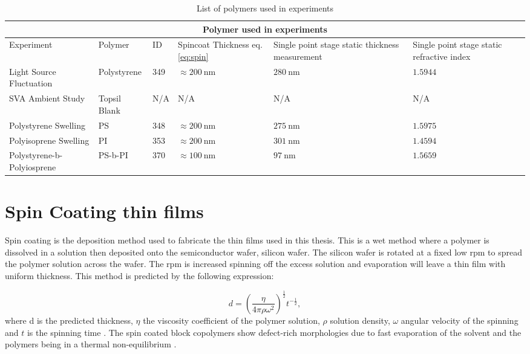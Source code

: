 \documentclass[MasterThesisMain.tex]{subfiles}
\begin{document}
\begin{table}
	\caption{List of polymers used in experiments}
\begin{tabular}{ |p{3cm}||p{2cm}|p{2cm}|p{2cm}|p{2cm}|p{2cm}|  }
 \hline
 \multicolumn{6}{|c|}{Polymer used in experiments} \\
 \hline
 Experiment & Polymer & ID & Spincoat Thickness eq.\ref{eq:spin} & Single point stage static thickness measurement & Single point stage static refractive index\\
 \hline
 Light Source Fluctuation & Polystyrene & 349 & $\approx\SI{200}{\nano\meter}$ & $\SI{280}{\nano\meter}$ & $1.5944$  \\
 SVA Ambient Study & Topsil Blank & N/A & N/A & N/A & N/A  \\
 Polystyrene Swelling & PS  & 348  & $\approx\SI{200}{\nano\meter}$ & $\SI{275}{\nano\meter}$ & $1.5975$  \\
 Polyisoprene Swelling & PI  & 353 & $\approx\SI{200}{\nano\meter}$ & $\SI{301}{\nano\meter}$ & $1.4594$  \\
 Polystyrene-b-Polyiosprene & PS-b-PI & 370 & $\approx\SI{100}{\nano\meter}$ & $\SI{97}{\nano\meter}$ & $1.5659$ \\  
\hline
\end{tabular}
\label{tab:polymers}
\end{table}

\section{Spin Coating thin films}
Spin coating is the deposition method used to fabricate the thin films used in this thesis. This is a wet method where a polymer is dissolved in a solution then deposited onto the semiconductor wafer, silicon wafer. The silicon wafer is rotated at a fixed low rpm to spread the polymer solution across the wafer. The rpm is increased spinning off the excess solution and evaporation will leave a thin film with uniform thickness. This method is predicted by the following expression:

\begin{equation}\label{eq:spin}
d = \left(\frac{\eta}{4\pi\rho\omega^2}\right)^{\frac{1}{2}} t^{-\frac{1}{2}},
\end{equation}  
where d is the predicted thickness, $\eta$ the viscosity coefficient of the polymer solution, $\rho$ solution density, $\omega$ angular velocity of the spinning and $t$ is the spinning time \cite{petty2008molecular}. The spin coated block copolymers show defect-rich morphologies due to fast evaporation of the solvent and the polymers being in a thermal non-equilibrium \cite{PosseltBCP}.
\end{document}
